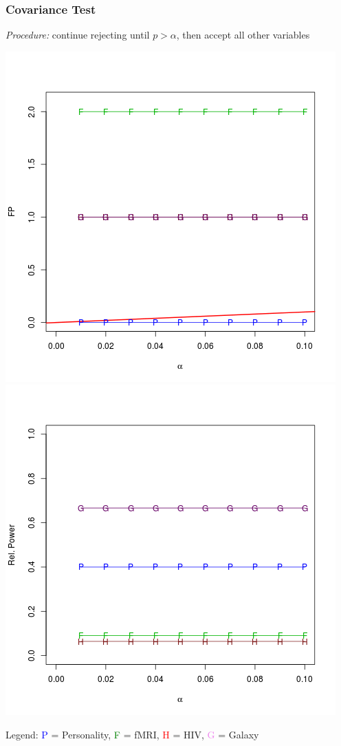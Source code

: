 \documentclass{beamer}
\begin{document}
\begin{frame}
\frametitle{Covariance Test}
\emph{Procedure:} continue rejecting until $p > \alpha$, then accept all other variables

\begin{center}
\includegraphics[scale = 0.3]{res_c_type1.png}
\includegraphics[scale = 0.3]{res_c_power.png}
\end{center}

Legend: \textcolor{blue}{P} = Personality, \textcolor{green}{F} = fMRI,
\textcolor{red}{H} = HIV, \textcolor{violet}{G} = Galaxy
\end{frame}
\end{document}

